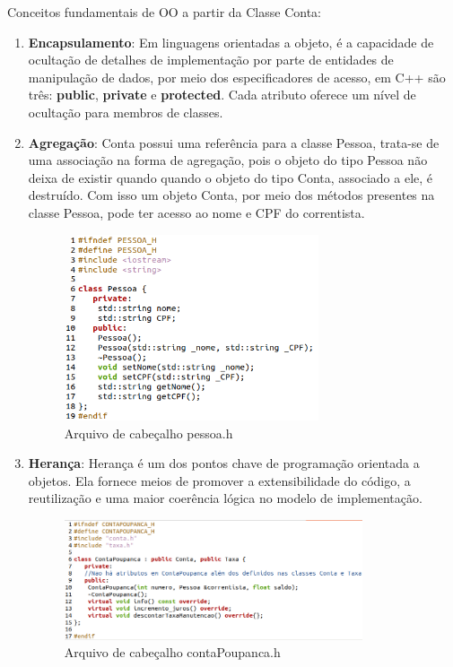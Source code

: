 \documentclass[conference]{IEEEtran}
\begin{document}
Conceitos fundamentais de OO a partir da Classe Conta:
\begin{enumerate}
    \item \textbf{Encapsulamento}: Em linguagens orientadas a objeto, é a capacidade de ocultação de detalhes de implementação por parte de entidades de manipulação de dados, por meio dos especificadores de acesso, em C++ são três: \textbf{public}, \textbf{private} e \textbf{protected}. Cada atributo oferece um nível de ocultação para membros de classes.
    \item \textbf{Agregação}: Conta possui uma referência para a classe Pessoa, trata-se de uma associação na forma de agregação, pois o objeto do tipo Pessoa não deixa de existir quando quando o objeto do tipo Conta, associado a ele, é destruído. Com isso um objeto Conta, por meio dos métodos presentes na classe Pessoa, pode ter acesso ao nome e CPF do correntista.
    \begin{figure}[htbp]
        \centering
        \includegraphics[width=7.5cm]{../img/Pessoa.png}
        \caption{Arquivo de cabeçalho pessoa.h}
        \label{fig_pessoa}
    \end{figure}
    \item \textbf{Herança}: Herança é um dos pontos chave de programação orientada a objetos. Ela fornece meios de promover a extensibilidade do código, a reutilização e uma maior coerência lógica no modelo de implementação.
    \begin{figure}[htbp]
        \centering
        \includegraphics[width=8.8cm]{../img/ContaPoupanca.png}
        \caption{Arquivo de cabeçalho contaPoupanca.h}
        \label{fig_contaPoupanca}
    \end{figure}
    

\end{enumerate}
\end{document}
